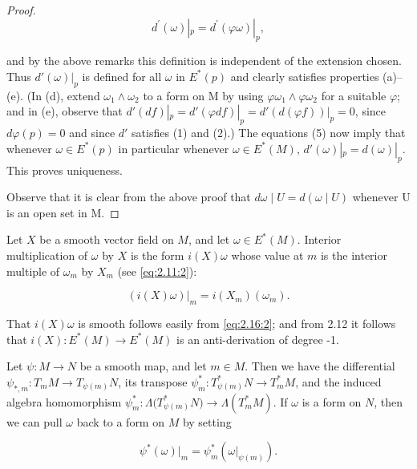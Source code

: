 \begin{proof}
\[
d^{\prime}(\omega)|_{p}=d^{\prime}(\varphi\omega)|_{p},
\]

and by the above remarks this definition is independent of the extension chosen. Thus  $ d'(\omega)|_{p} $ is defined for all  $ \omega $ in  $ E^{*}(p) $ and clearly satisfies properties (a)–(e). (In (d), extend  $ \omega_{1} \wedge \omega_{2} $ to a form on M by using  $ \varphi\omega_{1} \wedge \varphi\omega_{2} $ for a suitable  $ \varphi $; and in (e), observe that  $ d'(df)|_{p}=d'(\varphi df)|_{p}=d'(d(\varphi f))|_{p}=0 $, since  $ d\varphi(p)=0 $ and since  $ d' $ satisfies (1) and (2).) The equations (5) now imply that whenever  $ \omega \in E^{*}(p) $ in particular whenever  $ \omega \in E^{*}(M) $,  $ d'(\omega)|_{p}=d(\omega)|_{p} $. This proves uniqueness.

Observe that it is clear from the above proof that  $ d\omega \mid U = d(\omega \mid U) $ whenever U is an open set in M.

\end{proof}

\label{thm:2.21}
Let $X$ be a smooth vector field on $M$, and let $\omega \in E^*(M)$. Interior multiplication of $\omega$ by $X$ is the form $i(X)\omega$ whose value at $m$ is the interior multiple of $\omega_m$ by $X_m$ (see \eqref{eq:2.11:2}):

\begin{equation}
\tag{1}\label{eq:2.21:1}
\left(i(X)\omega\right)\big|_{m}=i(X_{m})(\omega_{m}).
\end{equation}

That $i(X)\omega$ is smooth follows easily from \eqref{eq:2.16:2}; and from 2.12 it follows that $i(X)\colon E^{*}(M)\to E^{*}(M)$ is an anti-derivation of degree -1.

\label{thm:2.22}
Let $\psi: M \to N$ be a smooth map, and let $m \in M$. Then we have the differential $\psi_{*,m}: T_{m} M \to T_{\psi(m)} N$, its transpose $\psi_m^{*}: T_{\psi(m)}^{*} N \to T_{m}^{*} M$, and the induced algebra homomorphism $\psi_m^{*}\colon \Lambda\big(T_{\psi(m)}^{*} N\big) \to \Lambda(T_{m}^{*} M)$. If $\omega$ is a form on $N$, then we can pull $\omega$ back to a form on $M$ by setting

\begin{equation}
\tag{1}\label{eq:2.22:1}
\psi^{*}(\omega)|_{m}=\psi_m^{*}(\omega|_{\psi(m)}).
\end{equation}

